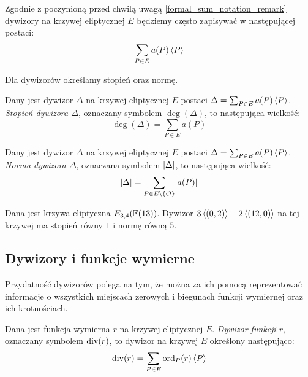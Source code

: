 \begin{remark}
Zgodnie z poczynioną przed chwilą uwagą \ref{formal_sum_notation_remark}
dywizory na krzywej eliptycznej $E$ będziemy często zapisywać
w następującej postaci:
\begin{equation*}
\sum_{P \in E} a(P)\left\langle P\right\rangle
\end{equation*}
\end{remark}

\noindent
Dla dywizorów określamy stopień oraz normę.

\begin{definition}
Dany jest dywizor $\Delta$ na krzywej eliptycznej $E$
postaci $\Delta = \sum_{P \in E} a(P)\left\langle P\right\rangle$.
\emph{Stopień dywizora $\Delta$},
oznaczany symbolem $\deg(\Delta)$,
to następująca wielkość:
\begin{equation*}
\deg(\Delta) = \sum_{P \in E} a(P)
\end{equation*}
\end{definition}

\begin{definition}
Dany jest dywizor $\Delta$ na krzywej eliptycznej $E$
postaci $\Delta = \sum_{P \in E} a(P)\left\langle P\right\rangle$.
\emph{Norma dywizora $\Delta$},
oznaczana symbolem $\lvert\Delta\rvert$,
to następująca wielkość:
\begin{equation*}
\lvert\Delta\rvert = \sum_{P \in E \setminus \{\mathcal{O}\}} \lvert a(P)\rvert
\end{equation*}
\end{definition}

\begin{example}
Dana jest krzywa eliptyczna $E_{3, 4}(\mathbb{F}(13))$.
Dywizor $3\left\langle(0, 2)\right\rangle - 2\left\langle(12, 0)\right\rangle$ na tej krzywej
ma stopień równy $1$ i normę równą $5$.
\end{example}

\subsection*{Dywizory i funkcje wymierne}

\noindent
Przydatność dywizorów polega na tym, że można za ich pomocą
reprezentować informacje
o wszystkich miejscach zerowych i biegunach funkcji wymiernej
oraz ich krotnościach.

\begin{definition}
Dana jest funkcja wymierna $r$ na krzywej eliptycznej $E$.
\emph{Dywizor funkcji $r$},
oznaczany symbolem $\operatorname{div}(r)$,
to dywizor na krzywej $E$ określony następująco:
\begin{equation*}
\operatorname{div}(r) = \sum_{P \in E} \operatorname{ord}_P(r)\left\langle P\right\rangle
\end{equation*}
\end{definition}

